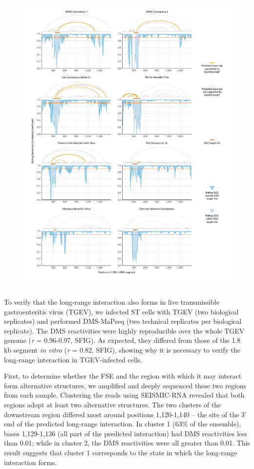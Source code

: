 \documentclass[main.tex]{subfiles}
\begin{document}
\begin{figure}[ht]
	\includegraphics[height=0.95\textheight]{../MainFigures/covs/covs.pdf}
	\caption{}
	\label{covs}
\end{figure}


\subsection{}

To verify that the long-range interaction also forms in live transmissible gastroenteritis virus (TGEV), we infected ST cells with TGEV (two biological replicates) and performed DMS-MaPseq (two technical replicates per biological replicate).
The DMS reactivities were highly reproducible over the whole TGEV genome (\textit{r} = 0.96-0.97, SFIG).
As expected, they differed from those of the 1.8 kb segment \textit{in vitro} (\textit{r} = 0.82, SFIG), showing why it is necessary to verify the long-range interaction in TGEV-infected cells.

First, to determine whether the FSE and the region with which it may interact form alternative structures, we amplified and deeply sequenced these two regions from each sample.
Clustering the reads using SEISMIC-RNA revealed that both regions adopt at least two alternative structures.
The two clusters of the downstream region differed most around positions 1,120-1,140 -- the site of the 3' end of the predicted long-range interaction.
In cluster 1 (63\% of the ensemble), bases 1,129-1,136 (all part of the predicted interaction) had DMS reactivities less than 0.01; while in cluster 2, the DMS reactivities were all greater than 0.01.
This result suggests that cluster 1 corresponds to the state in which the long-range interaction forms.
\end{document}
